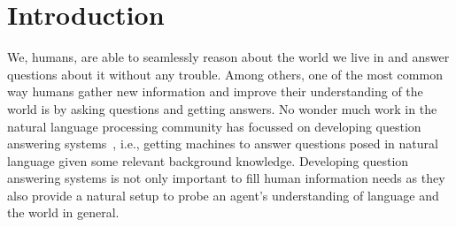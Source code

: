 \documentclass[main.tex]{subfiles}
\begin{document}
\section{Introduction} %
\label{sec:introduction}

We, humans, are able to seamlessly reason about the world we live in and answer questions about it without any trouble.
Among others, one of the most common way humans gather new information and improve their understanding of the world is by asking questions and getting answers.  No wonder much work in the natural language processing community has focussed on developing question answering systems~\cite{voorhees-qa-1999,kwok-qa-2001}, i.e., getting machines to answer questions posed in natural language given some relevant background knowledge. Developing question answering systems is not only important to fill human information needs as they also provide a natural setup to probe an agent's understanding of language and the world in general.


\end{document}
